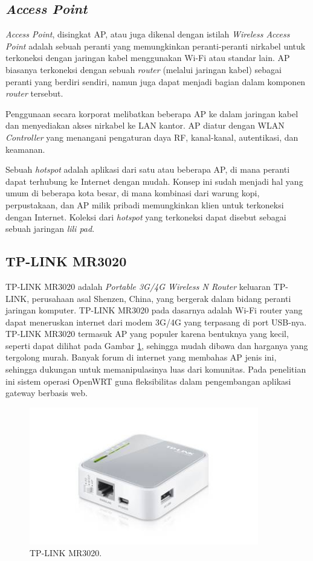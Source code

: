   \subsection{\emph{Access Point}}
    \emph{Access Point}, disingkat AP, atau juga dikenal dengan istilah \emph{Wireless Access Point} adalah sebuah peranti yang memungkinkan peranti-peranti nirkabel untuk terkoneksi dengan jaringan kabel menggunakan Wi-Fi atau standar lain. AP biasanya terkoneksi dengan sebuah \emph{router} (melalui jaringan kabel) sebagai peranti yang berdiri sendiri, namun juga dapat menjadi bagian dalam komponen \emph{router} tersebut.

    Penggunaan secara korporat melibatkan beberapa AP ke dalam jaringan kabel dan menyediakan akses nirkabel ke LAN kantor. AP diatur dengan WLAN \emph{Controller} yang menangani pengaturan daya RF, kanal-kanal, autentikasi, dan keamanan.
    
    Sebuah \emph{hotspot} adalah aplikasi dari satu atau beberapa AP, di mana peranti dapat terhubung ke Internet dengan mudah. Konsep ini sudah menjadi hal yang umum di beberapa kota besar, di mana kombinasi dari warung kopi, perpustakaan, dan AP milik pribadi memungkinkan klien untuk terkoneksi dengan Internet. Koleksi dari \emph{hotspot} yang terkoneksi dapat disebut sebagai sebuah jaringan \emph{lili pad}.

  \subsection{TP-LINK MR3020}
    TP-LINK MR3020 adalah \emph{Portable 3G/4G Wireless N Router} keluaran TP-LINK, perusahaan asal Shenzen, China, yang bergerak dalam bidang peranti jaringan komputer. TP-LINK MR3020 pada dasarnya adalah Wi-Fi router yang dapat meneruskan internet dari modem 3G/4G yang terpasang di port USB-nya. TP-LINK MR3020 termasuk AP yang populer karena bentuknya yang kecil, seperti dapat dilihat pada Gambar \ref{mr3020}, sehingga mudah dibawa dan harganya yang tergolong murah. Banyak forum di internet yang membahas AP jenis ini, sehingga dukungan untuk memanipulasinya luas dari komunitas. Pada penelitian ini sistem operasi OpenWRT guna fleksibilitas dalam pengembangan aplikasi gateway berbasis web.

    \begin{figure}[htp!]
      \centering
        \includegraphics[width=10cm]{gambar/mr3020}
        \caption{TP-LINK MR3020.}
        \label{mr3020}
    \end{figure}

